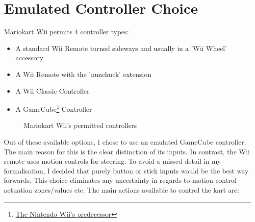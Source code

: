 \section{Emulated Controller Choice}
Mariokart Wii permits 4  controller types:
\begin{itemize}
    \item A standard Wii Remote turned sideways and usually in a 'Wii Wheel' accessory
    \item A Wii Remote with the 'nunchuck' extension
    \item A Wii Classic Controller
    \item A GameCube\footnote{\href{https://www.nintendo.co.uk/Hardware/Nintendo-History/Nintendo-GameCube/Nintendo-GameCube-627129.html}{The Nintendo Wii's predecessor}} Controller
\end{itemize}
\begin{figure}[ht]
    \centering
    \hfill
    \hfill
    \hfill
    \caption{Mariokart Wii's permitted controllers \cite{gc_image} \cite{wii_controllers}}
\end{figure}
Out of these available options, I chose to use an emulated GameCube controller. The main reason for this is the clear distinction of its inputs. In contrast, the Wii remote uses motion controls for steering. To avoid a missed detail in my formalisation, I decided that purely button or stick inputs would be the best way forwards. This choice eliminates any uncertainty in regards to motion control actuation zones/values etc. The main actions available to control the kart are:
\renewcommand{\labelitemii}{$\rightarrow$}
